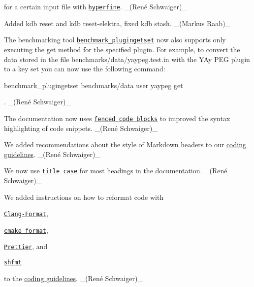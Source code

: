 \begin{DoxyItemize}
for a certain input file with \href{https://github.com/sharkdp/hyperfine}{\tt hyperfine}. \+\_\+(René Schwaiger)\+\_\+
\item Added {\ttfamily kdb reset} and {\ttfamily kdb reset-\/elektra}, fixed {\ttfamily kdb stash}. \+\_\+(\+Markus Raab)\+\_\+
\end{DoxyItemize}


\begin{DoxyItemize}
\item The benchmarking tool \href{https://master.libelektra.org/benchmarks/plugingetset.c}{\tt {\ttfamily benchmark\+\_\+plugingetset}} now also supports only executing the {\ttfamily get} method for the specified plugin. For example, to convert the data stored in the file {\ttfamily benchmarks/data/yaypeg.\+test.\+in} with the Y\+Ay P\+EG plugin to a key set you can now use the following command\+:
\end{DoxyItemize}


\begin{DoxyCode}
benchmark\_plugingetset benchmarks/data user yaypeg get
\end{DoxyCode}


. \+\_\+(René Schwaiger)\+\_\+


\begin{DoxyItemize}
\item The documentation now uses \href{https://help.github.com/en/articles/creating-and-highlighting-code-blocks#syntax-highlighting}{\tt fenced code blocks} to improved the syntax highlighting of code snippets. \+\_\+(René Schwaiger)\+\_\+
\item We added recommendations about the style of Markdown headers to our \hyperlink{doc_CODING_md}{coding guidelines}. \+\_\+(René Schwaiger)\+\_\+
\item We now use \href{https://en.wiktionary.org/wiki/title_case}{\tt title case} for most headings in the documentation. \+\_\+(René Schwaiger)\+\_\+
\item We added instructions on how to reformat code with
\begin{DoxyItemize}
\item \href{https://clang.llvm.org/docs/ClangFormat.html}{\tt Clang-\/\+Format},
\item \href{https://github.com/cheshirekow/cmake_format}{\tt cmake format},
\item \href{https://prettier.io}{\tt Prettier}, and
\item \href{https://github.com/mvdan/sh}{\tt shfmt}
\end{DoxyItemize}

to the \hyperlink{doc_CODING_md}{coding guidelines}. \+\_\+(René Schwaiger)\+\_\+
\end{DoxyItemize}


